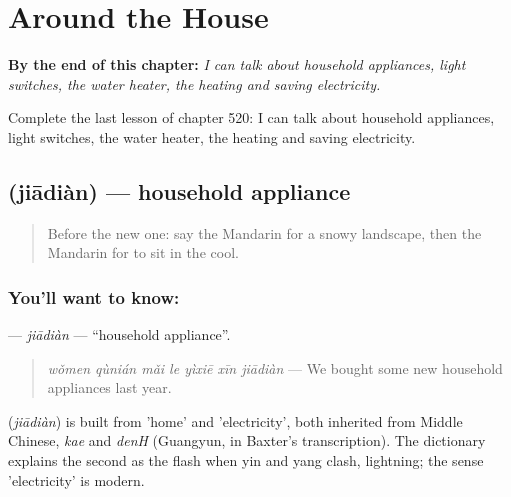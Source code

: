 
\chapter{Around the House}
\label{ch:zh-around-the-house}

\begin{chapteropening}
\textbf{By the end of this chapter:} \emph{I can talk about household appliances, light switches, the water heater, the heating and saving electricity.}

Complete the last lesson of chapter 520: I can talk about household appliances, light switches, the water heater, the heating and saving electricity.
\end{chapteropening}

\section[\texorpdfstring{\zh{家电} (jiādiàn)}{家电 (jiādiàn)}]{ (jiādiàn) — household appliance}

\label{lesson:ZH-C520-jiadian}



\begin{quote}
Before the new one: say the Mandarin for a snowy landscape, then the Mandarin for to sit in the cool.
\end{quote}

\subsection*{You'll want to know: }
\textbf{} — \emph{jiādiàn} — \textquotedblleft{}household appliance\textquotedblright{}.

\begin{quote}
\textbf{} \emph{wǒmen qùnián mǎi le yìxiē xīn jiādiàn} — We bought some new household appliances last year.
\end{quote}

\begin{cousinweb}
\textbf{} (\emph{jiādiàn}) is built from  'home' and  'electricity', both inherited from Middle Chinese, \emph{kae} and \emph{denH} (Guangyun, in Baxter's transcription). The dictionary explains the second as the flash when yin and yang clash, lightning; the sense 'electricity' is modern.
\end{cousinweb}

